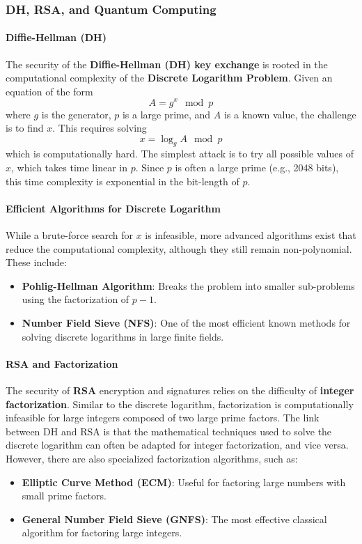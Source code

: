 \subsubsection{DH, RSA, and Quantum Computing}

\paragraph{Diffie-Hellman (DH)}  
The security of the \textbf{Diffie-Hellman (DH) key exchange} is
rooted in the computational complexity of the \textbf{Discrete
Logarithm Problem}. Given an equation of the form  
\[
A = g^x \mod p
\]  
where \(g\) is the generator, \(p\) is a large prime, and \(A\) is a
known value, the challenge is to find \(x\). This requires solving  
\[
x = \log_g A \mod p
\]  
which is computationally hard. The simplest attack is to try all
possible values of \(x\), which takes time linear in \(p\). Since
\(p\) is often a large prime (e.g., 2048 bits), this time complexity
is exponential in the bit-length of \(p\).  

\paragraph{Efficient Algorithms for Discrete Logarithm}  
While a brute-force search for \(x\) is infeasible, more advanced
algorithms exist that reduce the computational complexity, although
they still remain non-polynomial. These include:  
\begin{itemize}
    \item \textbf{Pohlig-Hellman Algorithm}: Breaks the problem into
      smaller sub-problems using the factorization of \(p-1\).  
    \item \textbf{Number Field Sieve (NFS)}: One of the most efficient
      known methods for solving discrete logarithms in large finite
      fields.  
\end{itemize}

\paragraph{RSA and Factorization}  
The security of \textbf{RSA} encryption and signatures relies on the
difficulty of \textbf{integer factorization}. Similar to the discrete
logarithm, factorization is computationally infeasible for large
integers composed of two large prime factors. The link between DH and
RSA is that the mathematical techniques used to solve the discrete
logarithm can often be adapted for integer factorization, and vice
versa. However, there are also specialized factorization algorithms,
such as:  
\begin{itemize}
    \item \textbf{Elliptic Curve Method (ECM)}: Useful for factoring
      large numbers with small prime factors.  
    \item \textbf{General Number Field Sieve (GNFS)}: The most
      effective classical algorithm for factoring large integers.  
\end{itemize}

